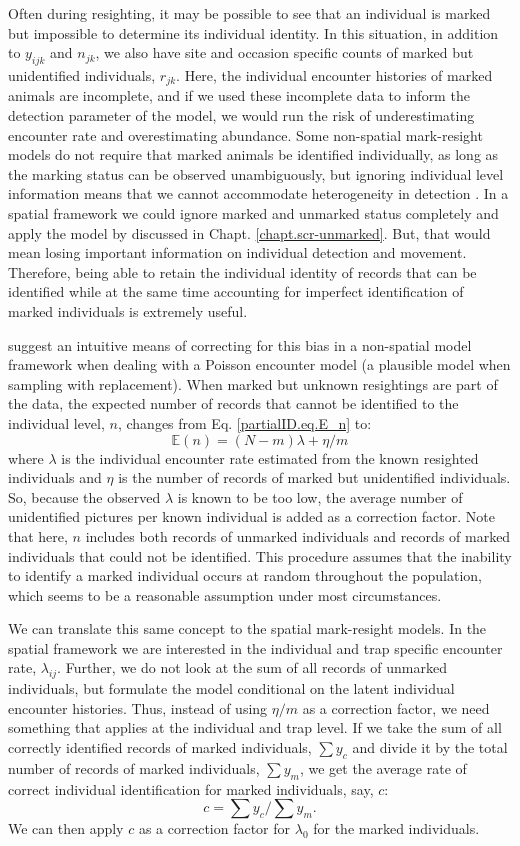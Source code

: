 Often during resighting, it may be possible to see that an individual
is marked but impossible to determine its individual identity. In this
situation, in addition to $y_{ijk}$ and $n_{jk}$, we also have
site and occasion specific counts of marked but unidentified
individuals, $r_{jk}$. Here, the individual encounter histories of
marked animals are incomplete, and if we used these incomplete data to
inform the detection parameter of the model, we would run the risk of
underestimating
encounter rate and overestimating
abundance. Some non-spatial mark-resight models do not require that
marked animals be identified individually, as long as the marking
status can be observed unambiguously, but ignoring individual level
information means that we cannot accommodate heterogeneity in
detection \citep{mcclintock_white:2010}. In a spatial framework we
could ignore marked and unmarked status completely and apply the model
by \citet{chandler_royle:2012} discussed in
Chapt. \ref{chapt.scr-unmarked}. But, that would mean losing important
information on individual detection and movement. Therefore, being
able to retain the individual identity of records that can be
identified while at the same time accounting for imperfect
identification of marked individuals is extremely useful.

\citet{mcclintock_etal:2009biometrics,mcclintock_etal:2009mdp} suggest
an intuitive means of correcting for this bias in a non-spatial model
framework when dealing with a Poisson encounter model
(a plausible
model when sampling
with replacement). When marked but unknown resightings are part of the
data, the expected number of records that cannot be identified to the individual level, $n$, changes from Eq. \ref{partialID.eq.E_n} to:
\[
\mathbb{E}(n) = (N-m) { \lambda  + \eta/m}
\]
where $\lambda$ is the individual encounter rate estimated from the known resighted individuals and $\eta$ is the number of records of marked but unidentified individuals. So, because the observed $\lambda$ is known to be too low, the average number of unidentified pictures per known individual is added as a correction factor. Note that here, $n$ includes both records of unmarked individuals and records of marked individuals that could not be identified. This procedure assumes that the inability to identify a marked individual occurs at random throughout the population, which seems to be a reasonable assumption under most circumstances.


We can translate this same concept to the spatial mark-resight
models. In the spatial framework we are interested in the individual
and trap specific encounter rate, $\lambda_{ij}$. Further, we do not
look at the sum of all records of unmarked individuals, but formulate
the model conditional on the latent individual encounter
histories. Thus, instead of using $\eta/m$ as a correction factor, we
need something that applies at the individual and trap level. If we
take the sum of all correctly identified records of marked
individuals, $\sum y_c$ and divide it by the total number of records
of marked individuals, $\sum y_m$, we get the average rate of correct
individual identification for marked individuals, say, $c$:
\[
c = \sum y_c/\sum y_m.
\]
We can then apply $c$ as a correction factor for $\lambda_0$ for the marked individuals.

